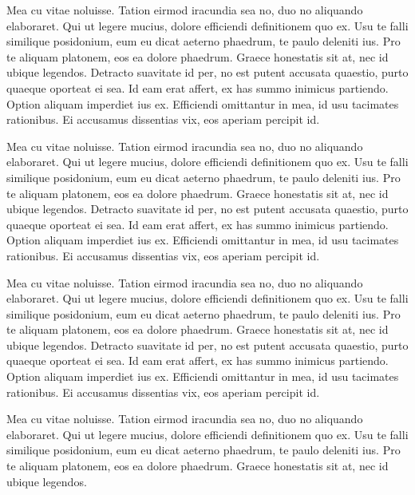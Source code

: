 Mea cu vitae noluisse. Tation eirmod iracundia sea no, duo no aliquando elaboraret. Qui ut legere mucius, dolore efficiendi definitionem quo ex. Usu te falli similique posidonium, eum eu dicat aeterno phaedrum, te paulo deleniti ius. Pro te aliquam platonem, eos ea dolore phaedrum. Graece honestatis sit at, nec id ubique legendos.
Detracto suavitate id per, no est putent accusata quaestio, purto quaeque oporteat ei sea. Id eam erat affert, ex has summo inimicus partiendo. Option aliquam imperdiet ius ex. Efficiendi omittantur in mea, id usu tacimates rationibus. Ei accusamus dissentias vix, eos aperiam percipit id.

Mea cu vitae noluisse. Tation eirmod iracundia sea no, duo no aliquando elaboraret. Qui ut legere mucius, dolore efficiendi definitionem quo ex. Usu te falli similique posidonium, eum eu dicat aeterno phaedrum, te paulo deleniti ius. Pro te aliquam platonem, eos ea dolore phaedrum. Graece honestatis sit at, nec id ubique legendos.
Detracto suavitate id per, no est putent accusata quaestio, purto quaeque oporteat ei sea. Id eam erat affert, ex has summo inimicus partiendo. Option aliquam imperdiet ius ex. Efficiendi omittantur in mea, id usu tacimates rationibus. Ei accusamus dissentias vix, eos aperiam percipit id.

Mea cu vitae noluisse. Tation eirmod iracundia sea no, duo no aliquando elaboraret. Qui ut legere mucius, dolore efficiendi definitionem quo ex. Usu te falli similique posidonium, eum eu dicat aeterno phaedrum, te paulo deleniti ius. Pro te aliquam platonem, eos ea dolore phaedrum. Graece honestatis sit at, nec id ubique legendos.
Detracto suavitate id per, no est putent accusata quaestio, purto quaeque oporteat ei sea. Id eam erat affert, ex has summo inimicus partiendo. Option aliquam imperdiet ius ex. Efficiendi omittantur in mea, id usu tacimates rationibus. Ei accusamus dissentias vix, eos aperiam percipit id.

Mea cu vitae noluisse. Tation eirmod iracundia sea no, duo no aliquando elaboraret. Qui ut legere mucius, dolore efficiendi definitionem quo ex. Usu te falli similique posidonium, eum eu dicat aeterno phaedrum, te paulo deleniti ius. Pro te aliquam platonem, eos ea dolore phaedrum. Graece honestatis sit at, nec id ubique legendos.

